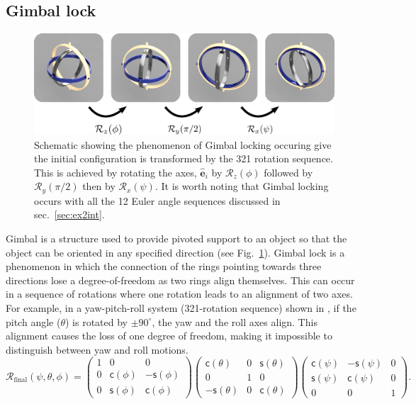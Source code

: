 \documentclass{article}
\def\eh{\hat{\mathbf{e}}}
\def\R{\mathcal{R}}
\def\c{\textsf{c}}
\def\s{\textsf{s}}
\begin{document}
\subsection{Gimbal lock}
\begin{figure}[t!]
  \centering
  \includegraphics[width=\textwidth]{figs/figGimbal.png}
  \caption{Schematic showing the phenomenon of Gimbal locking occuring give the initial configuration is transformed by the 321 rotation sequence. This is achieved by rotating the axes, $\eh_i$ by $\R_z(\phi)$ followed by $\R_y(\pi/2)$ then by $\R_x(\psi)$. It is worth noting that Gimbal locking occurs with all the 12 Euler angle sequences discussed in sec.~\ref{sec:ex2int}.}
  \label{fig:gimbLck}
\end{figure}
Gimbal is a structure used to provide pivoted support to an object so that the object can be oriented in any specified direction (see Fig.~\ref{fig:gimbLck}). Gimbal lock is a phenomenon in which the connection of the rings pointing towards three directions lose a degree-of-freedom as two rings align themselves. This can occur in a sequence of rotations where one rotation leads to an alignment of two axes. For example, in a yaw-pitch-roll system (321-rotation sequence) shown in , if the pitch angle (\( \theta \)) is rotated by \( \pm 90^\circ \), the yaw and the roll axes align. This alignment causes the loss of one degree of freedom, making it impossible to distinguish between yaw and roll motions.
\[
\R_{\text{final}} (\psi, \theta, \phi) = 
\begin{pmatrix}
1 & 0 & 0 \\
0 & \c(\phi) & -\s(\phi) \\
0 & \s(\phi) & \c(\phi)
\end{pmatrix}
\begin{pmatrix}
\c(\theta) & 0 & \s(\theta) \\
0 & 1 & 0 \\
-\s(\theta) & 0 & \c(\theta)
\end{pmatrix}
\begin{pmatrix}
\c(\psi) & -\s(\psi) & 0 \\
\s(\psi) & \c(\psi) & 0 \\
0 & 0 & 1
\end{pmatrix}.
\]
\end{document}
